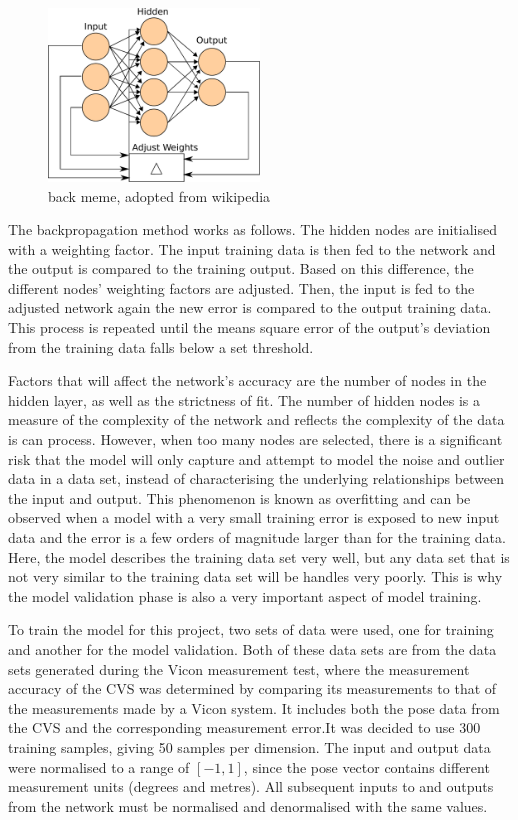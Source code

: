 \begin{figure}
  \centering
  \includegraphics[width=0.5\textwidth]{figures/chapter4/backpropagation}
  \caption{back meme, adopted from wikipedia}
\label{fig:chap4-backprogagation}
\end{figure}

The backpropagation method works as follows. The hidden nodes are initialised with a weighting factor. The input training data is then fed to the network and the output is compared to the training output. Based on this difference, the different nodes' weighting factors are adjusted. Then, the input is fed to the adjusted network again the new error is compared to the output training data. This process is repeated until the means square error of the output's deviation from the training data falls below a set threshold. 

Factors that will affect the network's accuracy are the number of nodes in the hidden layer, as well as the strictness of fit. The number of hidden nodes is a measure of the complexity of the network and reflects the complexity of the data is can process. However, when too many nodes are selected, there is a significant risk that the model will only capture and attempt to model the noise and outlier data in a data set, instead of characterising the underlying relationships between the input and output. This phenomenon is known as overfitting and can be observed when a model with a very small training error is exposed to new input data and the error is a few orders of magnitude larger than for the training data. Here, the model describes the training data set very well, but any data set that is not very similar to the training data set will be handles very poorly. This is why the model validation phase is also a very important aspect of model training. 

To train the model for this project, two sets of data were used, one for training and another for the model validation. Both of these data sets are from the data sets generated during the Vicon measurement test, where the measurement accuracy of the CVS was determined by comparing its measurements to that of the measurements made by a Vicon system. It includes both the pose data from the CVS and the corresponding measurement error.It was decided to use 300 training samples, giving 50 samples per dimension. The input and output data were normalised to a range of $[-1, 1]$, since the pose vector contains different measurement units (degrees and metres). All subsequent inputs to and outputs from the network must be normalised and denormalised with the same values.  

